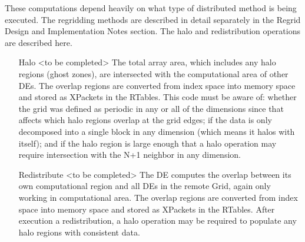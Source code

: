 \begin{enumerate}
These computations depend heavily on what type of distributed
method is being executed.  The regridding methods are described
in detail separately in the Regrid Design and Implementation Notes
section.  The halo and redistribution operations are described here.

\begin{enumerate}

\item[Halo]  <to be completed>  The total array area, which
includes any halo regions (ghost zones),
are intersected with the computational
area of other DEs. The overlap regions are converted from index
space into memory space and stored as XPackets in the RTables.
This code must be aware of: whether the grid was defined as
periodic in any or all of the dimensions since that affects
which halo regions overlap at the grid edges; if the data
is only decomposed into a single block in any dimension (which
means it halos with itself); and if the halo region is large
enough that a halo operation may require intersection with
the N+1 neighbor in any dimension.

\item[Redistribute]  <to be completed>  The DE computes the overlap
between its own computational region and all DEs in the 
remote Grid, again only working in computational area.  
The overlap regions are converted from index
space into memory space and stored as XPackets in the RTables.
After execution a redistribution, a halo operation may be required
to populate any halo regions with consistent data.

\end{enumerate}

\end{enumerate}

\newpage





